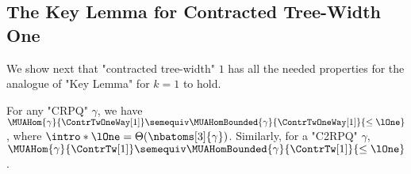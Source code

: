 \subsection{\AP{}The Key Lemma for Contracted Tree-Width One}
We show next that "contracted tree-width" $1$ has all the needed properties for the analogue of "Key Lemma" for $k=1$ to hold.

\begin{lemma}
    \AP\label{lemma:bound_size_refinements_tw}
    \AP For any "CRPQ" $\gamma$, we have
    $\MUAHom{\gamma}{\ContrTwOneWay[1]} \semequiv \MUAHomBounded{\gamma}{\ContrTwOneWay[1]}{\leq\lOne}$, where
    $\intro*\lOne = \Theta(\nbatoms[3]{\gamma})$.
	Similarly, for a "C2RPQ" $\gamma$,
	$\MUAHom{\gamma}{\ContrTw[1]} \semequiv
		\MUAHomBounded{\gamma}{\ContrTw[1]}{\leq\lOne}$.
\end{lemma}

